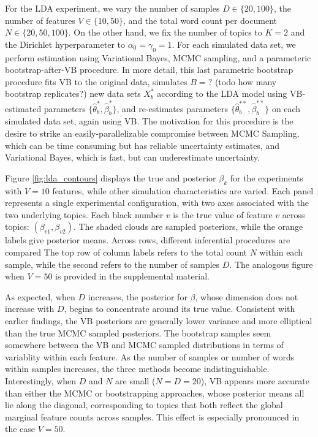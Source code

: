\documentclass[oupdraft]{bio}
\begin{document}
For the LDA experiment, we vary the number of samples $D \in \{20, 100\}$, the
number of features $V \in \{10, 50\}$, and the total word count per document $N
\in \{20, 50, 100\}$. On the other hand, we fix the number of topics to $K = 2$
and the Dirichlet hyperparameter to $\alpha_{0} = \gamma_{0} = 1$. For each
simulated data set, we perform estimation using Variational Bayes, MCMC
sampling, and a parameteric bootstrap-after-VB procedure. In more detail, this
last parametric bootstrap procedure fits VB to the original data, simulates $B =
?$ (todo how many bootstrap replicates?) new data sets $X^{\ast}_{b}$ according
to the LDA model using VB-estimated parameters $\{\hat{\theta}^{\ast}_{b},
\hat{\beta}^{\ast}_{b}\}$, and re-estimates parameters
$\{\hat{\theta}^{\ast\ast}_{b}, \hat{\beta}^{\ast\ast}_{b}\}$ on each simulated data
set, again using VB. The motivation for this procedure is the desire to strike
an easily-parallelizable compromise between MCMC Sampling, which can be time
consuming but has reliable uncertainty estimates, and Variational Bayes, which
is fast, but can underestimate uncertainty.

Figure \ref{fig:lda_contours} displays the true and posterior $\beta_{k}$ for
the experiments with $V = 10$ features, while other simulation characteristics
are varied. Each panel represents a single experimental configuration, with two
axes associated with the two underlying topics. Each black number $v$ is the
true value of feature $v$ across topics: $\left(\beta_{v1}, \beta_{v2}\right)$.
The shaded clouds are sampled posteriors, while the orange labels give posterior
means. Across rows, different inferential procedures are compared The top row of
column labels refers to the total count $N$ within each sample, while the second
refers to the number of samples $D$. The analogous figure when $V = 50$ is
provided in the supplemental material.

As expected, when $D$ increases, the posterior for $\beta$, whose dimension does
not increase with $D$, begins to concentrate around its true value. Consistent
with earlier findings, the VB posteriors are generally lower variance and more
elliptical than the true MCMC sampled posteriors. The bootstrap samples seem
somewhere between the VB and MCMC sampled distributions in terms of variablity
within each feature. As the number of samples or number of words within samples
increases, the three methods become indistinguishable. Interestingly, when $D$
and $N$ are small ($N = D = 20$), VB appears more accurate than either the MCMC
or bootstrapping approaches, whose posterior means all lie along the diagonal,
corresponding to topics that both reflect the global marginal feature counts
across samples. This effect is especially pronounced in the case $V = 50$.
\end{document}
